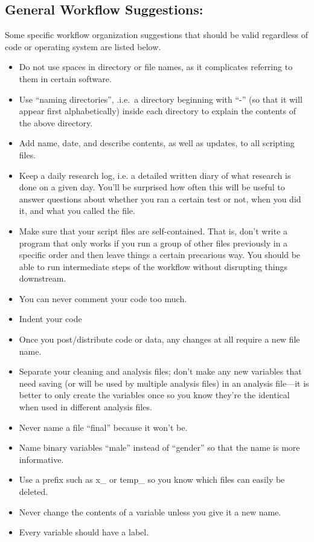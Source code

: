 \documentclass[12pt] {article}
\begin{document}
\subsection{General Workflow
Suggestions:}\label{general-workflow-suggestions}
Some specific workflow organization suggestions that should be valid regardless of code or operating system are listed below.
\begin{itemize}
\item
  Do not use spaces in directory or file names, as it complicates referring to them in certain software.
\item
  Use ``naming directories'', .i.e.~a directory beginning with ``-'' (so
  that it will appear first alphabetically) inside each directory to
  explain the contents of the above directory.
\item
  Add name, date, and describe contents, as well as updates, to all
  scripting files.
\item
  Keep a daily research log, i.e. a detailed written diary of what research is done on a given day. You'll be surprised how often this will be useful to answer questions about whether you ran a certain test or not, when you did it, and what you called the file.
  
\item
    Make sure that your script files are self-contained. That is, don't write a program that only works if you run a group of other files previously in a specific order and then leave things a certain precarious way. You should be able to run intermediate steps of the workflow without disrupting things downstream.
 
\item
  You can never comment your code too much.
\item
  Indent your code
\item
    Once you post/distribute code or data, any changes at all require a new file name.
\item
  Separate your cleaning and analysis files; don't make any new variables
  that need saving (or will be used by multiple analysis
  files) in an analysis file---it is better to only create the variables once so you know they're the identical when used in different analysis files.
\item
  Never name a file ``final'' because it won't be.
\item
  Name binary variables ``male'' instead of ``gender'' so that the name is more informative. 
\item
  Use a prefix such as x\_ or temp\_ so you know which files can easily
  be deleted.
\item
  Never change the contents of a variable unless you give it a new name.
\item
  Every variable should have a label.
\end{itemize}
\end{document}
